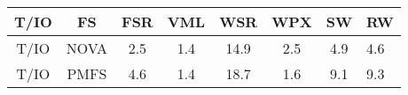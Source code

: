\begin{tabular}{c|cccccc}
\toprule
 T/IO &    FS &  FSR &  VML &  WSR &  WPX &  SW &  RW \\
\midrule
 T/IO &  NOVA &  2.5 &  1.4 & 14.9 &  2.5 & 4.9 & 4.6 \\
 T/IO &  PMFS &  4.6 &  1.4 & 18.7 &  1.6 & 9.1 & 9.3 \\
\bottomrule
\end{tabular}
